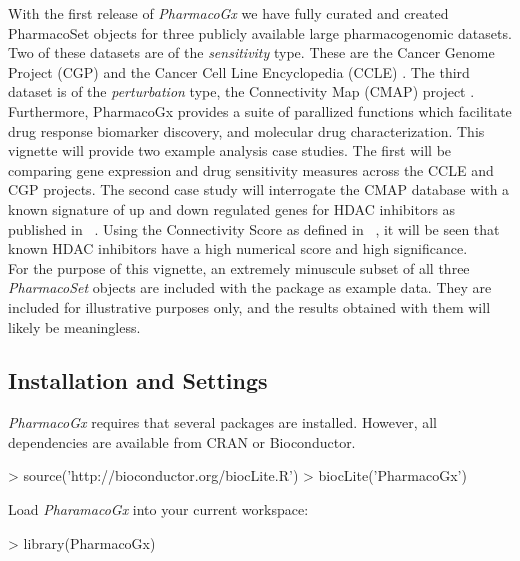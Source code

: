 \documentclass[11pt]{article}
\begin{document}
With the first release of \textit{PharmacoGx} we have fully curated and
created PharmacoSet objects for three publicly available large pharmacogenomic
datasets. Two of these datasets are of the \textit{sensitivity} type. These
are the Cancer Genome Project (CGP) \cite{Garnett:2012fc} and the Cancer Cell
Line Encyclopedia (CCLE) \cite{Barretina:2012fp}. The third dataset is of the
\textit{perturbation} type, the Connectivity Map (CMAP) project
\cite{Lamb:2006hf}.\\

Furthermore, PharmacoGx provides a suite of parallized functions which
facilitate drug response biomarker discovery, and molecular drug
characterization. This vignette will provide two example analysis case
studies. The first will be comparing gene expression and drug sensitivity
measures across the CCLE and CGP projects. The second case study will
interrogate the CMAP database with a known signature of up and down regulated
genes for HDAC inhibitors as published in ~\cite{Glaser:2003gk}. Using the
Connectivity Score as defined in ~\cite{Lamb:2006hf}, it will be seen that
known HDAC inhibitors have a high numerical score and high significance.\\ %

For the purpose of this vignette, an extremely minuscule subset of all three
\textit{PharmacoSet} objects are included with the package as example data.
They are included for illustrative purposes only, and the results obtained
with them will likely be meaningless.\\


\subsection{Installation and Settings}

\textit{PharmacoGx} requires that several packages are installed. However, all dependencies are available from CRAN or Bioconductor.

\begin{Schunk}
\begin{Sinput}
> source('http://bioconductor.org/biocLite.R')
> biocLite('PharmacoGx')
\end{Sinput}
\end{Schunk}

Load \textit{PharamacoGx} into your current workspace:
\begin{Schunk}
\begin{Sinput}
> library(PharmacoGx)
\end{Sinput}
\end{Schunk}
\end{document}
